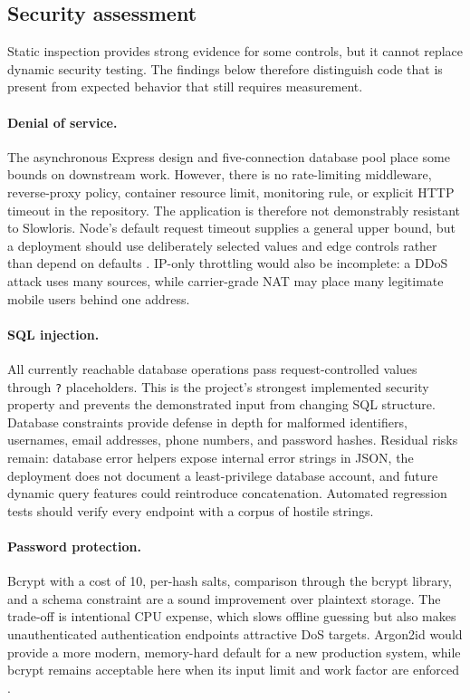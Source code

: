 \subsection{Security assessment}

Static inspection provides strong evidence for some controls, but it cannot replace dynamic security testing. The findings below therefore distinguish code that is present from expected behavior that still requires measurement.

\paragraph{Denial of service.} The asynchronous Express design and five-connection database pool place some bounds on downstream work. However, there is no rate-limiting middleware, reverse-proxy policy, container resource limit, monitoring rule, or explicit HTTP timeout in the repository. The application is therefore not demonstrably resistant to Slowloris. Node's default request timeout supplies a general upper bound, but a deployment should use deliberately selected values and edge controls rather than depend on defaults \cite{NodeHTTP}. IP-only throttling would also be incomplete: a DDoS attack uses many sources, while carrier-grade NAT may place many legitimate mobile users behind one address.

\paragraph{SQL injection.} All currently reachable database operations pass request-controlled values through \verb|?| placeholders. This is the project's strongest implemented security property and prevents the demonstrated input from changing SQL structure. Database constraints provide defense in depth for malformed identifiers, usernames, email addresses, phone numbers, and password hashes. Residual risks remain: database error helpers expose internal error strings in JSON, the deployment does not document a least-privilege database account, and future dynamic query features could reintroduce concatenation. Automated regression tests should verify every endpoint with a corpus of hostile strings.

\paragraph{Password protection.} Bcrypt with a cost of 10, per-hash salts, comparison through the bcrypt library, and a schema constraint are a sound improvement over plaintext storage. The trade-off is intentional CPU expense, which slows offline guessing but also makes unauthenticated authentication endpoints attractive DoS targets. Argon2id would provide a more modern, memory-hard default for a new production system, while bcrypt remains acceptable here when its input limit and work factor are enforced \cite{OWASPPassword}.


